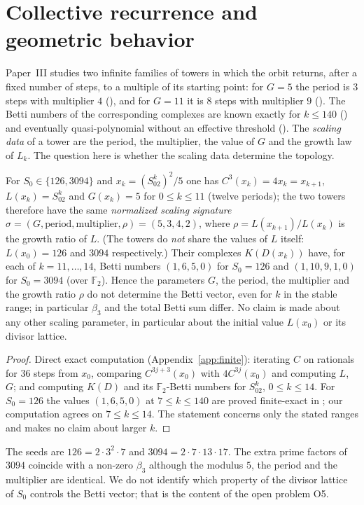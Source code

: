 \section{Collective recurrence and geometric behavior}\label{sec:recurrence}
Paper~III studies two infinite families of towers in which the orbit returns, after a fixed number of steps, to a multiple of its starting point: for $G=5$ the period is $3$ steps with multiplier $4$ (), and for $G=11$ it is $8$ steps with multiplier $9$ (). The Betti numbers of the corresponding complexes are known exactly for $k\le140$ () and eventually quasi-polynomial without an effective threshold (). The \emph{scaling data} of a tower are the period, the multiplier, the value of $G$ and the growth law of $L_k$. The question here is whether the scaling data determine the topology.

\begin{proposition}\label{prop:P8}
For $S_0\in\{126,3094\}$ and $x_k=(S_02^k)^2/5$ one has $C^3(x_k)=4x_k=x_{k+1}$, $L(x_k)=S_02^k$ and $G(x_k)=5$ for $0\le k\le11$ (twelve periods); the two towers therefore have the same \emph{normalized scaling signature} $\sigma=(G,\text{period},\text{multiplier},\rho)=(5,3,4,2)$, where $\rho=L(x_{k+1})/L(x_k)$ is the growth ratio of $L$. (The towers do \emph{not} share the values of $L$ itself: $L(x_0)=126$ and $3094$ respectively.) Their complexes $K(D(x_k))$ have, for each of $k=11,\dots,14$, Betti numbers $(1,6,5,0)$ for $S_0=126$ and $(1,10,9,1,0)$ for $S_0=3094$ (over $\mathbb F_2$). Hence the parameters $G$, the period, the multiplier and the growth ratio $\rho$ do not determine the Betti vector, even for $k$ in the stable range; in particular $\beta_3$ and the total Betti sum differ. No claim is made about any other scaling parameter, in particular about the initial value $L(x_0)$ or its divisor lattice.
\end{proposition}
\begin{proof}
Direct exact computation (Appendix~\ref{app:finite}): iterating $C$ on rationals for $36$ steps from $x_0$, comparing $C^{3j+3}(x_0)$ with $4C^{3j}(x_0)$ and computing $L$, $G$; and computing $K(D)$ and its $\mathbb F_2$-Betti numbers for $S_02^k$, $0\le k\le14$. For $S_0=126$ the values $(1,6,5,0)$ at $7\le k\le140$ are proved finite-exact in ; our computation agrees on $7\le k\le14$. The statement concerns only the stated ranges and makes no claim about larger $k$.
\end{proof}
\begin{remark}
The seeds are $126=2\cdot3^2\cdot7$ and $3094=2\cdot7\cdot13\cdot17$. The extra prime factors of $3094$ coincide with a non-zero $\beta_3$ although the modulus $5$, the period and the multiplier are identical. We do not identify which property of the divisor lattice of $S_0$ controls the Betti vector; that is the content of the open problem O5.
\end{remark}

